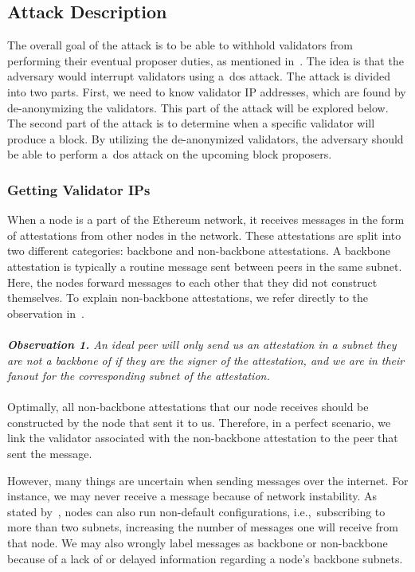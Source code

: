 \subsection{Attack Description}\label{subsec:attack-description}
The overall goal of the attack is to be able to withhold validators from performing their eventual proposer duties, as mentioned in~\cite{EthereumAttackDefense2024}.
The idea is that the adversary would interrupt validators using a~\gls{dos} attack.
The attack is divided into two parts.
First, we need to know validator IP addresses, which are found by de-anonymizing the validators.
This part of the attack will be explored below.
The second part of the attack is to determine when a specific validator will produce a block.
By utilizing the de-anonymized validators, the adversary should be able to perform a~\gls{dos} attack on the upcoming block proposers.

\subsubsection{Getting Validator IPs}
When a node is a part of the Ethereum network,
it receives messages in the form of attestations from other nodes in the network.
These attestations are split into two different categories: backbone and non-backbone attestations.
A backbone attestation is typically a routine message sent between peers in the same subnet.
Here, the nodes forward messages to each other that they did not construct themselves.
To explain non-backbone attestations, we refer directly to the observation in~\cite{heimbach2024deanonymizingethereumvalidatorsp2p}.
\\\\
\textit{\textbf{Observation 1.} An ideal peer will only send us an attestation in a subnet they are not a backbone of
if they are the signer of the attestation, and we are in their fanout for the corresponding subnet of the attestation.}
\\\\

Optimally, all non-backbone attestations that our node receives should be constructed by the node that sent it to us.
Therefore, in a perfect scenario, we link the validator associated with the non-backbone attestation to the peer that sent the message.

However, many things are uncertain when sending messages over the internet.
For instance, we may never receive a message because of network instability.
As stated by~\cite{heimbach2024deanonymizingethereumvalidatorsp2p}, nodes can also run non-default configurations, i.e.,\ subscribing to more than two subnets, increasing the number of messages one will receive from that node.
We may also wrongly label messages as backbone or non-backbone because of a lack of or delayed information regarding a node's backbone subnets.

